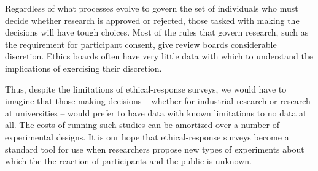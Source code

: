 Regardless of what processes evolve to govern the set of individuals who must decide whether research is approved or rejected, those tasked with making the decisions will have tough choices.  Most of the rules that govern research, such as the requirement for participant consent, give review boards considerable discretion.  Ethics boards often have very little data with which to understand the implications of exercising their discretion.

Thus, despite the limitations of ethical-response surveys, we would have to imagine that those making decisions -- whether for industrial research or research at universities -- would prefer to have data with known limitations to no data at all.  The costs of running such studies can be amortized over a number of experimental designs.  It is our hope that ethical-response surveys become a standard tool for use when researchers propose new types of experiments about which the the reaction of participants and the public is unknown.
